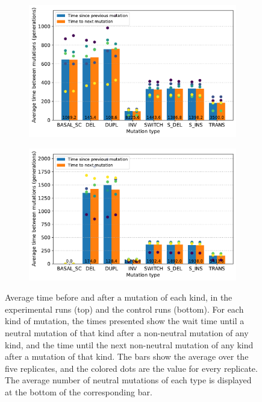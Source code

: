 \begin{figure}[H]
  \begin{subfigure}[t]{\textwidth}
    \includegraphics[width=\textwidth]{aevol/images/epistasis_sc.pdf}
  \end{subfigure}
  \begin{subfigure}[t]{\textwidth}
    \includegraphics[width=\textwidth]{aevol/images/epistasis_control.pdf}
  \end{subfigure}
  \caption[Measuring epistasis with the average times before and after mutations]{Average time before and after a mutation of each kind, in the experimental runs (top) and the control runs (bottom).
  For each kind of mutation, the times presented show the wait time until a neutral mutation of that kind after a non-neutral mutation of any kind, and the time until the next non-neutral mutation of any kind after a mutation of that kind.
  The bars show the average over the five replicates, and the colored dots are the value for every replicate.
  The average number of neutral mutations of each type is displayed at the bottom of the corresponding bar.}
  \label{fig:aevol:epistasis}
\end{figure}

